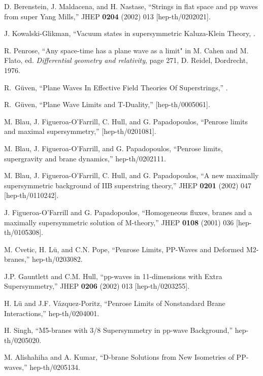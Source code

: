 \documentclass[a4paper,12pt]{article}
\begin{document}
\begin{thebibliography}{99}

 D. Berenstein, J. Maldacena, and H. Nastase, ``Strings in flat space and pp waves from \coordHE{} super Yang Mills,'' JHEP {\bf 0204} (2002) 013 [hep-th/0202021].

 J. Kowalski-Glikman, ``Vacuum states in supersymmetric Kaluza-Klein Theory, .

R. Penrose, ``Any space-time has a plane wave as a limit" in M. Cahen and M. Flato, ed. {\it Differential geometry and relativity}, page 271, D. Reidel, Dordrecht, 1976.

R.~G\"{u}ven,
``Plane Waves In Effective Field Theories Of Superstrings,'' .

 R.~G\"{u}ven, ``Plane Wave Limits and T-Duality,''  [hep-th/0005061].

 M. Blau, J. Figueroa-O'Farrill, C. Hull, and G. Papadopoulos, ``Penrose limits and maximal supersymmetry,''  [hep-th/0201081].

 M. Blau, J. Figueroa-O'Farrill, and G. Papadopoulos, ``Penrose limits, supergravity and brane dynamics,'' hep-th/0202111.

 M. Blau, J. Figueroa-O'Farrill, C. Hull, and G. Papadopoulos, ``A new maximally supersymmetric background of IIB superstring theory,'' JHEP {\bf 0201} (2002) 047 [hep-th/0110242].

 J. Figueroa-O'Farrill and G. Papadopoulos, ``Homogeneous fluxes, branes and a maximally supersymmetric solution of M-theory,'' JHEP {\bf 0108} (2001) 036 [hep-th/0105308].

 M. Cvetic, H. L\"{u}, and C.N. Pope, ``Penrose Limits, PP-Waves and Deformed M2-branes,'' hep-th/0203082.

  J.P. Gauntlett and C.M. Hull, ``pp-waves in 11-dimensions with Extra Supersymmetry,'' JHEP {\bf 0206} (2002) 013 [hep-th/0203255].

 H. L\"{u} and J.F. V\'{a}zquez-Poritz, ``Penrose Limits of Nonstandard Brane Interactions,'' hep-th/0204001.

 H. Singh, ``M5-branes with 3/8 Supersymmetry in pp-wave Background,'' hep-th/0205020.

 M. Alishahiha and A. Kumar, ``D-brane Solutions from New Isometries of PP-waves,'' hep-th/0205134.


\end{thebibliography}
\end{document}
